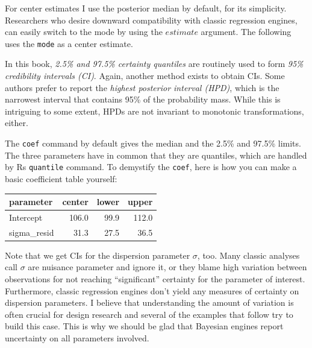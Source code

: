 \documentclass[]{svmono}
\newenvironment{Shaded}{\begin{snugshade}}{\end{snugshade}}
\newcommand{\KeywordTok}[1]{\textcolor[rgb]{0.13,0.29,0.53}{\textbf{#1}}}
\newcommand{\DataTypeTok}[1]{\textcolor[rgb]{0.13,0.29,0.53}{#1}}
\newcommand{\DecValTok}[1]{\textcolor[rgb]{0.00,0.00,0.81}{#1}}
\newcommand{\FloatTok}[1]{\textcolor[rgb]{0.00,0.00,0.81}{#1}}
\newcommand{\StringTok}[1]{\textcolor[rgb]{0.31,0.60,0.02}{#1}}
\newcommand{\OperatorTok}[1]{\textcolor[rgb]{0.81,0.36,0.00}{\textbf{#1}}}
\newcommand{\NormalTok}[1]{#1}
\begin{document}
For center estimates I use the posterior median by default, for its
simplicity. Researchers who desire downward compatibility with classic
regression engines, can easily switch to the mode by using the
\(estimate\) argument. The following uses the \texttt{mode} as a center
estimate.

In this book, \emph{2.5\% and 97.5\% certainty quantiles} are routinely
used to form \emph{95\% credibility intervals (CI)}. Again, another
method exists to obtain CIs. Some authors prefer to report the
\emph{highest posterior interval (HPD)}, which is the narrowest interval
that contains 95\% of the probability mass. While this is intriguing to
some extent, HPDs are not invariant to monotonic transformations,
either.

The \texttt{coef} command by default gives the median and the 2.5\% and
97.5\% limits. The three parameters have in common that they are
quantiles, which are handled by Rs \texttt{quantile} command. To
demystify the \texttt{coef}, here is how you can make a basic
coefficient table yourself:

\begin{Shaded}
\end{Shaded}

\begin{tabular}{l|r|r|r}
\hline
parameter & center & lower & upper\\
\hline
Intercept & 106.0 & 99.9 & 112.0\\
\hline
sigma\_resid & 31.3 & 27.5 & 36.5\\
\hline
\end{tabular}

Note that we get CIs for the dispersion parameter \(\sigma\), too. Many
classic analyses call \(\sigma\) are nuisance parameter and ignore it,
or they blame high variation between observations for not reaching
``significant'' certainty for the parameter of interest. Furthermore,
classic regression engines don't yield any measures of certainty on
dispersion parameters. I believe that understanding the amount of
variation is often crucial for design research and several of the
examples that follow try to build this case. This is why we should be
glad that Bayesian engines report uncertainty on all parameters
involved.
\end{document}
